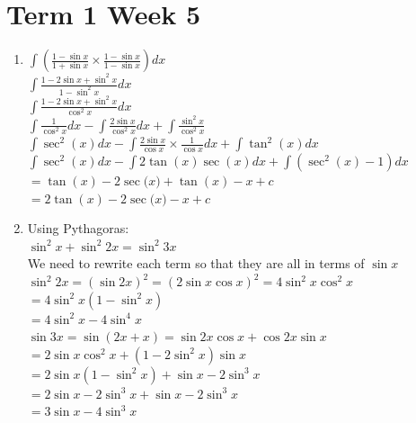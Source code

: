 \documentclass[../main.tex]{subfiles}
\begin{document}
\section*{Term 1 Week 5}
\begin{enumerate}
    \item 
    \(\int (\frac{1-\sin{x}}{1+\sin{x}} \times \frac{1-\sin{x}}{1-\sin{x}}) dx\)\\

    \(\int \frac{1-2\sin{x}+\sin^2{x}}{1-\sin^2{x}} dx\)\\

    \(\int \frac{1-2\sin{x}+\sin^2{x}}{\cos^2{x}} dx\)\\

    \(\int \frac{1}{\cos^2{x}} dx-\int \frac{2\sin{x}}{\cos^2{x}}dx + \int \frac{\sin^2{x}}{\cos^2{x}} \)\\

    \(\int \sec^2{(x)}dx - \int \frac{2\sin{x}}{\cos{x}}\times \frac{1}{\cos{x}} dx + \int \tan^2{(x)}dx\)\\

    \(\int \sec^2{(x)}dx - \int 2\tan{(x)}\sec{(x)} dx + \int (\sec^2{(x)}-1) dx\)\\

    \(=\tan{(x)}-2\sec{(x})+\tan{(x)}-x+c\)\\

    \(=2\tan{(x)}-2\sec{(x})-x+c\)\\
    
    \item 
    Using Pythagoras:\\
    \(\sin^2{x}+\sin^2{2x}=\sin^2{3x}\)\\

    We need to rewrite each term so that they are all in terms of \(\sin{x}\)\\
    \(\sin^2{2x}=(\sin{2x})^2=(2\sin{x}\cos{x})^2=4\sin^2{x}\cos^2{x}\)\\
    \(=4\sin^2{x}(1-\sin^2{x})\)\\
    \(=4\sin^2{x}-4\sin^4{x}\)\\

    \(\sin{3x}=\sin{(2x+x)}=\sin{2x}\cos{x}+\cos{2x}\sin{x}\)\\
    \(=2\sin{x}\cos^2{x}+(1-2\sin^2{x})\sin{x}\)\\
    \(=2\sin{x}(1-\sin^2{x})+\sin{x}-2\sin^3{x}\)\\
    \(=2\sin{x}-2\sin^3{x}+\sin{x}-2\sin^3{x}\)\\
    \(=3\sin{x}-4\sin^3{x}\)\\
    

\end{enumerate}
\end{document}
